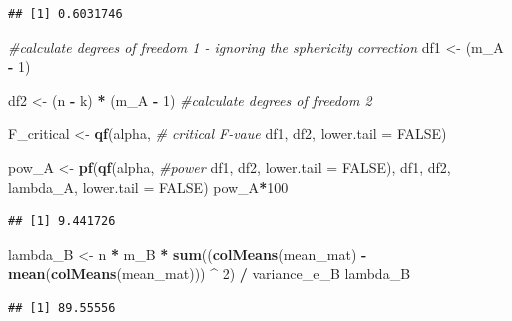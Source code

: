 \documentclass[
]{book}
\newenvironment{Shaded}{\begin{snugshade}}{\end{snugshade}}
\newcommand{\CommentTok}[1]{\textcolor[rgb]{0.56,0.35,0.01}{\textit{#1}}}
\newcommand{\DataTypeTok}[1]{\textcolor[rgb]{0.13,0.29,0.53}{#1}}
\newcommand{\DecValTok}[1]{\textcolor[rgb]{0.00,0.00,0.81}{#1}}
\newcommand{\KeywordTok}[1]{\textcolor[rgb]{0.13,0.29,0.53}{\textbf{#1}}}
\newcommand{\NormalTok}[1]{#1}
\newcommand{\OperatorTok}[1]{\textcolor[rgb]{0.81,0.36,0.00}{\textbf{#1}}}
\newcommand{\OtherTok}[1]{\textcolor[rgb]{0.56,0.35,0.01}{#1}}
\newcommand{\StringTok}[1]{\textcolor[rgb]{0.31,0.60,0.02}{#1}}
\begin{document}
\begin{verbatim}
## [1] 0.6031746
\end{verbatim}

\begin{Shaded}
\begin{Highlighting}[]
\CommentTok{#calculate degrees of freedom 1 - ignoring the sphericity correction}
\NormalTok{df1 <-}\StringTok{ }\NormalTok{(m_A }\OperatorTok{-}\StringTok{ }\DecValTok{1}\NormalTok{) }

\NormalTok{df2 <-}\StringTok{ }\NormalTok{(n }\OperatorTok{-}\StringTok{ }\NormalTok{k) }\OperatorTok{*}\StringTok{ }\NormalTok{(m_A }\OperatorTok{-}\StringTok{ }\DecValTok{1}\NormalTok{) }\CommentTok{#calculate degrees of freedom 2}

\NormalTok{F_critical <-}\StringTok{ }\KeywordTok{qf}\NormalTok{(alpha, }\CommentTok{# critical F-vaue}
\NormalTok{                 df1,}
\NormalTok{                 df2, }
                 \DataTypeTok{lower.tail =} \OtherTok{FALSE}\NormalTok{) }

\NormalTok{pow_A <-}\StringTok{ }\KeywordTok{pf}\NormalTok{(}\KeywordTok{qf}\NormalTok{(alpha, }\CommentTok{#power }
\NormalTok{             df1, }
\NormalTok{             df2, }
             \DataTypeTok{lower.tail =} \OtherTok{FALSE}\NormalTok{), }
\NormalTok{          df1, }
\NormalTok{          df2, }
\NormalTok{          lambda_A, }
          \DataTypeTok{lower.tail =} \OtherTok{FALSE}\NormalTok{)}
\NormalTok{pow_A}\OperatorTok{*}\DecValTok{100}
\end{Highlighting}
\end{Shaded}

\begin{verbatim}
## [1] 9.441726
\end{verbatim}

\begin{Shaded}
\begin{Highlighting}[]
\NormalTok{lambda_B <-}
\StringTok{  }\NormalTok{n }\OperatorTok{*}\StringTok{ }\NormalTok{m_B }\OperatorTok{*}\StringTok{ }\KeywordTok{sum}\NormalTok{((}\KeywordTok{colMeans}\NormalTok{(mean_mat) }\OperatorTok{-}\StringTok{ }
\StringTok{                   }\KeywordTok{mean}\NormalTok{(}\KeywordTok{colMeans}\NormalTok{(mean_mat))) }\OperatorTok{^}\StringTok{ }\DecValTok{2}\NormalTok{) }\OperatorTok{/}\StringTok{ }\NormalTok{variance_e_B }
\NormalTok{lambda_B}
\end{Highlighting}
\end{Shaded}

\begin{verbatim}
## [1] 89.55556
\end{verbatim}
\end{document}
